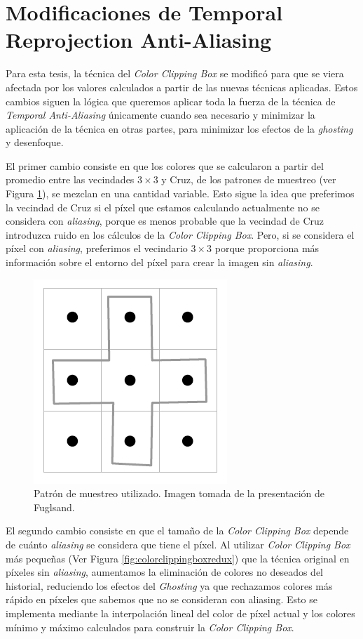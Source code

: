 \documentclass[pregrado]{tesis-usb} %
\begin{document}
\section[Modificaciones de Temporal Reprojection Anti-Aliasing ]{Modificaciones de Temporal Reprojection Anti-Aliasing }
Para esta tesis, la técnica del \textit{Color Clipping Box} se modificó para que se viera afectada por los valores calculados a partir de las nuevas técnicas aplicadas. Estos cambios siguen la lógica que queremos aplicar toda la fuerza de la técnica de \textit{Temporal Anti-Aliasing} únicamente cuando sea necesario y minimizar la aplicación de la técnica en otras partes, para minimizar los efectos de la \textit{ghosting} y desenfoque.

El primer cambio consiste en que los colores que se calcularon a partir del promedio entre las vecindades $3\times 3$ y Cruz, de los patrones de muestreo (ver Figura \ref{fig:samplingpattern_2}), se mezclan en una cantidad variable. Esto sigue la idea que preferimos la vecindad de Cruz si el píxel que estamos calculando actualmente no se considera con \textit{aliasing}, porque es menos probable que la vecindad de Cruz introduzca ruido en los cálculos de la \textit{Color Clipping Box}. Pero, si se considera el píxel con \textit{aliasing}, preferimos el vecindario $3\times 3$ porque proporciona más información sobre el entorno del píxel para crear la imagen sin \textit{aliasing}. 

\begin{figure}[!hbt]
	\centering
	\includegraphics[scale=0.3]{images/sampling_pattern.png}
	\caption{Patrón de muestreo utilizado. Imagen tomada de la presentación de Fuglsand. \protect\cite{Fuglsand2016}}\label{fig:samplingpattern_2}
\end{figure}

El segundo cambio consiste en que el tamaño de la \textit{Color Clipping Box} depende de cuánto \textit{aliasing} se considera que tiene el píxel. Al utilizar \textit{Color Clipping Box} más pequeñas (Ver Figura \ref{fig:colorclippingboxredux}) que la técnica original en píxeles sin \textit{aliasing}, aumentamos la eliminación de colores no deseados del historial, reduciendo los efectos del \textit{Ghosting} ya que rechazamos colores más rápido en píxeles que sabemos que no se consideran con aliasing. Esto se implementa mediante la interpolación lineal del color de píxel actual y los colores mínimo y máximo calculados para construir la \textit{Color Clipping Box}.
\end{document}
